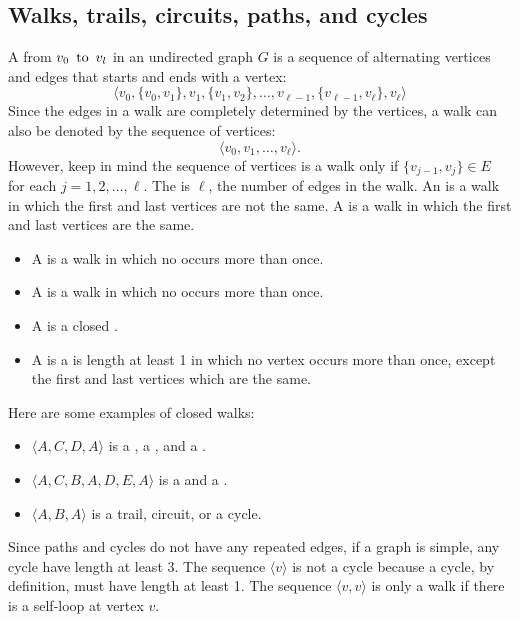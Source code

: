 \subsection{Walks, trails, circuits, paths, and cycles}
A  from $v_0 \operatorname{~\text{to}~} v_l$ in an undirected graph $G$ is a sequence of alternating vertices and edges that starts and ends with a vertex:
\[
  \langle v_0,\{v_0,v_1\},v_1,\{v_1,v_2\},\ldots,v_{\ell-1},\{v_{\ell-1},v_\ell\},v_\ell\rangle
\]
Since the edges in a walk are completely determined by the vertices, a walk can also be denoted by the sequence of vertices:
\[
  \langle v_0,v_1,\ldots,v_\ell \rangle.
\]
However, keep in mind the sequence of vertices is a walk only if $\{v_{j-1},v_j\} \in E$ for each $j = 1,2,\ldots,\ell$. The  is $\ell$, the number of edges in the walk. An  is a walk in which the first and last vertices are not the same. A  is a walk in which the first and last vertices are the same.
\begin{itemize}
  \item A  is a walk in which no  occurs more than once.
  \item A  is a walk in which no  occurs more than once.
  \item A  is a closed .
  \item A  is a  is length at least 1 in which no vertex occurs more than once, except the first and last vertices which are the same.
\end{itemize}
Here are some examples of closed walks:
\begin{itemize}
  \item $\langle A,C,D,A \rangle$ is a , a , and a .
  \item $\langle A,C,B,A,D,E,A \rangle$ is a  and a .
  \item $\langle A,B,A \rangle$ is  a trail, circuit, or a cycle.
\end{itemize}
Since paths and cycles do not have any repeated edges, if a graph is simple, any cycle  have length at least 3. The sequence $\langle v \rangle$ is not a cycle because a cycle, by definition, must have length at least 1. The sequence $\langle v,v \rangle$ is only a walk if there is a self-loop at vertex $v$.

